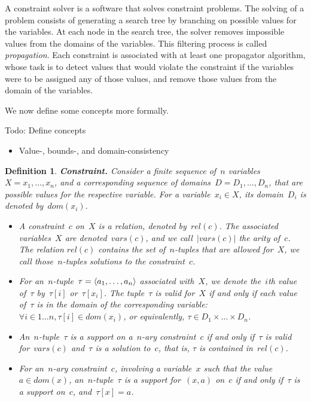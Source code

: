 \documentclass[a4paper,11pt]{article}
\newtheorem{definition}{Definition}
\newcommand{\Todo}[1]{{\color{blue}#1}}
\numberwithin{equation}{section}
\begin{document}
A constraint solver is a software that solves constraint problems.
The solving of a problem consists of generating a search tree by branching
on possible values for the variables. At each node in the search tree,
the solver removes impossible values from the domains of the variables.
This filtering process is called \emph{propagation}. Each constraint is
associated with at least one propagator algorithm, whose task is to detect
values that would violate the constraint if the variables were to be assigned
any of those values, and remove those values from the domain of the variables.

We now define some concepts more formally.


% 

\Todo{Todo: Define concepts
\begin{itemize}
  \item Value-, bounds-, and domain-consistency
\end{itemize}
}

\begin{definition}
  \textbf{Constraint.} Consider a finite sequence of~$n$ 
  variables~$X = x_1,\ldots,x_n$, and a corresponding sequence of
  \emph{domains}~$D = D_1,\ldots,D_n$, that are possible values for the
  respective variable. 
  For a variable~$x_i \in X$, its domain~$D_i$ is denoted 
  by~$dom(x_i)$.
  \begin{itemize}
    \item   A \emph{constraint}~$c$ on~$X$ is a relation, 
      denoted by~$rel(c)$. The associated variables~$X$ are denoted~$vars(c)$,
      and we call~$|vars(c)|$ the \emph{arity} of~$c$. The relation
      $rel(c)$ contains the set of~$n$-tuples that are allowed
      for~$X$, we call those~$n$-tuples \emph{solutions} to the constraint~$c$.
    \item   For an~$n$-tuple~$\tau = \left\langle a_1,\ldots,a_n\right\rangle$ associated with~$X$, we
      denote the~$i$th value of~$\tau$ by~$\tau[i]$ or~$\tau[x_i]$. The 
      tuple~$\tau$ is \emph{valid} for~$X$
      if and only if each value of~$\tau$ is in the domain of the corresponding
      variable: $\forall i \in 1 \ldots n, \tau[i] \in dom(x_i)$, or equivalently,
      $\tau \in D_1 \times \ldots \times D_n$.
    \item An~$n$-tuple~$\tau$ is a \emph{support} on a~$n$-ary constraint~$c$ if and only
      if~$\tau$ is valid for~$vars(c)$ and~$\tau$ is a solution to~$c$, that is,
      $\tau$ is contained in~$rel(c)$.
    \item For an~$n$-ary constraint~$c$, involving a variable~$x$ such that
      the value~$a \in dom(x)$, an~$n$-tuple~$\tau$ is a 
      \emph{support for}~$(x,a)$ on~$c$ if and only if~$\tau$ is a support on~$c$,
      and~$\tau[x] = a$.
    \end{itemize}
\end{definition}
\end{document}
